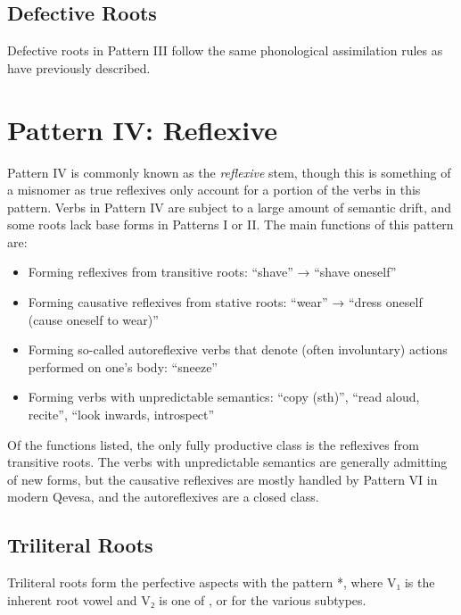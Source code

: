 \documentclass[grammar]{subfiles}
\begin{document}
\subsection{Defective Roots}
\label{ssec:vm_iii_defective_roots}

Defective roots in Pattern III follow the same phonological assimilation rules
as have previously described. 


\section{Pattern IV: Reflexive}
\label{sec:vm_pattern_iv}

Pattern IV is commonly known as the \emph{reflexive} stem, though this is
something of a misnomer as true reflexives only account for a portion of the
verbs in this pattern.  Verbs in Pattern IV are subject to a large amount of
semantic drift, and some roots lack base forms in Patterns I or II.  The main
functions of this pattern are: 

\begin{itemize}
  \item Forming reflexives from transitive roots:  “shave” → 
    “shave oneself”
  \item Forming causative reflexives from stative roots:  “wear” →
     “dress oneself (cause oneself to wear)”
  \item Forming so-called autoreflexive verbs that denote (often involuntary)
    actions performed on one’s body:  “sneeze”
  \item Forming verbs with unpredictable semantics:  “copy (sth)”,
     “read aloud, recite”,  “look inwards, introspect”
\end{itemize}

Of the functions listed, the only fully productive class is the reflexives from
transitive roots.  The verbs with unpredictable semantics are generally
admitting of new forms, but the causative reflexives are mostly handled by
Pattern VI in modern Qevesa, and the autoreflexives are a closed class.


\subsection{Triliteral Roots}
\label{ssec:vm_iv_triliteral_roots}

Triliteral roots form the perfective aspects with the pattern *,
where V₁ is the inherent root vowel and V₂ is one of ,  or 
for the various subtypes.  
\end{document}
